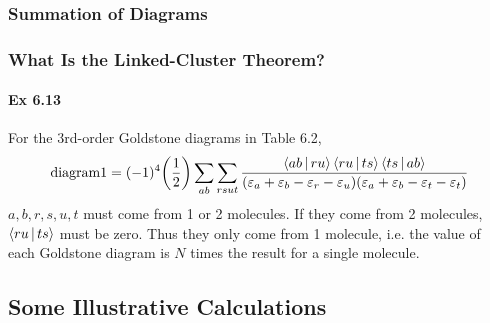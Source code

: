 \documentclass[a4paper]{article}
\newcommand{\ex}[1]{\paragraph{Ex #1}}
\numberwithin{equation}{subsection}
\begin{document}
\subsubsection{Summation of Diagrams}

\subsubsection{What Is the Linked-Cluster Theorem?}
\ex{6.13}
For the 3rd-order Goldstone diagrams in Table 6.2,
\begin{equation}\label{key}
\text{diagram1} = (-1)^4 \qty(\dfrac{1}{2}) \sum_{ab}\sum_{rsut} \dfrac{\Braket{ab|ru}\Braket{ru|ts}\Braket{ts|ab} }{(\varepsilon_a + \varepsilon_b - \varepsilon_r - \varepsilon_u)(\varepsilon_a + \varepsilon_b - \varepsilon_t - \varepsilon_t)}
\end{equation}
$ a,b,r,s,u,t $ must come from 1 or 2 molecules. If they come from 2 molecules, $ \Braket{ru|ts} $ must be zero. Thus they only come from 1 molecule, i.e. the value of each Goldstone diagram is $ N $ times the result for a single molecule.





\subsection{Some Illustrative Calculations}
\end{document}
